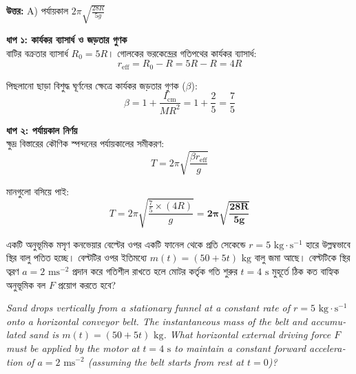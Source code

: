 \documentclass[12pt, a4paper]{article}
\begin{document}
{{\vspace{0.5em}
\begin{tcolorbox}[answerbox]
    \textbf{\color{success} উত্তর:} A) পর্যায়কাল $2\pi \sqrt{\frac{28 R}{5 g}}$
\end{tcolorbox}
\vspace{1em}

\begin{tcolorbox}[solutionbox={সমাধান (Solution)}]
    \noindent
    \textbf{ধাপ ১: কার্যকর ব্যাসার্ধ ও জড়তার গুণক} \\
    বাটির বক্রতার ব্যাসার্ধ $R_0 = 5R$। গোলকের ভরকেন্দ্রের গতিপথের কার্যকর ব্যাসার্ধ:
    \[ r_{\text{eff}} = R_0 - R = 5R - R = 4R \]
    
    পিছলানো ছাড়া বিশুদ্ধ ঘূর্ণনের ক্ষেত্রে কার্যকর জড়তার গুণক ($\beta$):
    \[ \beta = 1 + \frac{I_{\text{cm}}}{M R^2} = 1 + \frac{2}{5} = \frac{7}{5} \]
    
    \vspace{0.5em}
    \noindent\textbf{ধাপ ২: পর্যায়কাল নির্ণয়} \\
    ক্ষুদ্র বিস্তারের কৌণিক স্পন্দনের পর্যায়কালের সমীকরণ:
    \[ T = 2\pi \sqrt{\frac{\beta r_{\text{eff}}}{g}} \]
    
    মানগুলো বসিয়ে পাই:
    \[ T = 2\pi \sqrt{\frac{\frac{7}{5} \times (4R)}{g}} = \mathbf{2\pi \sqrt{\frac{28 R}{5 g}}} \]
\end{tcolorbox}

\newpage

\begin{tcolorbox}[questionbox={প্রশ্ন (Question) 38}]
    \noindent
    একটি অনুভূমিক মসৃণ কনভেয়ার বেল্টের ওপর একটি ফানেল থেকে প্রতি সেকেন্ডে $r = 5\text{ kg}\cdot\text{s}^{-1}$ হারে উল্লম্বভাবে স্থির বালু পতিত হচ্ছে। বেল্টটির ওপর ইতিমধ্যে $m(t) = (50 + 5t)\text{ kg}$ বালু জমা আছে। বেল্টটিকে স্থির ত্বরণ $a = 2\text{ ms}^{-2}$ প্রদান করে গতিশীল রাখতে হলে মোটর কর্তৃক গতি শুরুর $t = 4\text{ s}$ মুহূর্তে ঠিক কত বাহ্যিক অনুভূমিক বল $F$ প্রয়োগ করতে হবে?
    
    \vspace{0.8em}
    \begin{english}
    \noindent\textit{\color{darkgray}
    Sand drops vertically from a stationary funnel at a constant rate of $r = 5\text{ kg}\cdot\text{s}^{-1}$ onto a horizontal conveyor belt. The instantaneous mass of the belt and accumulated sand is $m(t) = (50 + 5t)\text{ kg}$. What horizontal external driving force $F$ must be applied by the motor at $t = 4\text{ s}$ to maintain a constant forward acceleration of $a = 2\text{ ms}^{-2}$ (assuming the belt starts from rest at $t = 0$)?
    }
    \end{english}
\end{tcolorbox}

}}
\end{document}
